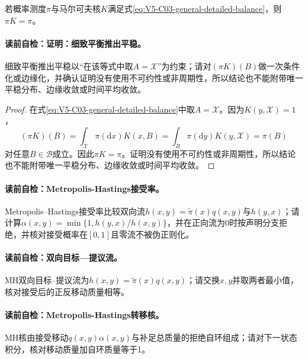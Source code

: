 \label{struct:V5-C03-CH12}
\begin{proposition}[细致平衡推出平稳]\label{prop:V5-C03-db-stationary}
若概率测度$\pi$与马尔可夫核$K$满足式\eqref{eq:V5-C03-general-detailed-balance}，则$\pi K=\pi$。
\end{proposition}

\label{struct:V5-C03-CH13}
\paragraph{读前自检：证明：细致平衡推出平稳。}细致平衡推出平稳以“在该等式中取$A=\mathcal X$”为约束；请对$(\pi K)(B)$做一次条件化或边缘化，并确认证明没有使用不可约性或非周期性，所以结论也不能附带唯一平稳分布、边缘收敛或时间平均收敛。\par

\begin{proof}
在式\eqref{eq:V5-C03-general-detailed-balance}中取$A=\mathcal X$。因为$K(y,\mathcal X)=1$，
\[
(\pi K)(B)
=\int_{\mathcal X}\pi(\mathrm dx)K(x,B)
=\int_B\pi(\mathrm dy)K(y,\mathcal X)
=\pi(B)
\]
对任意$B\in\mathcal B$成立。因此$\pi K=\pi$。证明没有使用不可约性或非周期性，所以结论也不能附带唯一平稳分布、边缘收敛或时间平均收敛。
\end{proof}

\paragraph{读前自检：Metropolis-Hastings接受率。}Metropolis--Hastings接受率比较双向流$h(x,y)=\widetilde\pi(x)q(x,y)$与$h(y,x)$；请计算$\alpha(x,y)=\min\{1,h(y,x)/h(x,y)\}$，并在正向流为0时按声明分支拒绝，并核对接受概率在$[0,1]$且零流不被伪正则化。\par
\paragraph{读前自检：双向目标—提议流。}MH双向目标--提议流为$h(x,y)=\widetilde\pi(x)q(x,y)$；请交换$x,y$并取两者最小值，核对接受后的正反移动质量相等。\par
\paragraph{读前自检：Metropolis-Hastings转移核。}MH核由接受移动$q(x,y)\alpha(x,y)$与补足总质量的拒绝自环组成；请对下一状态积分，核对移动质量加自环质量等于1。\par

